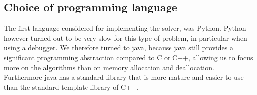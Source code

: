 \subsection{Choice of programming language}
The first language considered for implementing the solver, was Python. Python however turned out to be very slow for this type of problem, in particular when using a debugger. We therefore turned to java, because java still provides a significant programming abstraction compared to C or C++, allowing us to focus more on the algorithms than on memory allocation and deallocation. Furthermore java has a standard library that is more mature and easier to use than the standard template library of C++. 


